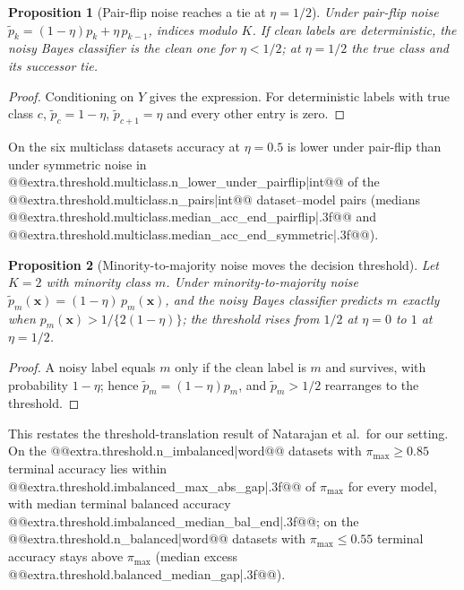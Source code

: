 \documentclass[pdflatex,sn-mathphys]{sn-jnl}
\theoremstyle{thmstyleone}
\newtheorem{appproposition}{Proposition}
\theoremstyle{thmstyletwo}
\theoremstyle{thmstylethree}
\begin{document}
\begin{appendices}
\begin{appproposition}[Pair-flip noise reaches a tie at $\eta=1/2$]\label{prop:a_pairflip_tie}
Under pair-flip noise $\tilde{p}_k=(1-\eta)p_k+\eta\,p_{k-1}$, indices modulo $K$. If clean labels are deterministic, the noisy Bayes classifier is the clean one for $\eta<1/2$; at $\eta=1/2$ the true class and its successor tie.
\end{appproposition}
\begin{proof}
Conditioning on $Y$ gives the expression. For deterministic labels with true class $c$, $\tilde{p}_c=1-\eta$, $\tilde{p}_{c+1}=\eta$ and every other entry is zero.
\end{proof}
On the six multiclass datasets accuracy at $\eta=0.5$ is lower under pair-flip than under symmetric noise in @@{extra.threshold.multiclass.n_lower_under_pairflip|int}@@ of the @@{extra.threshold.multiclass.n_pairs|int}@@ dataset--model pairs (medians @@{extra.threshold.multiclass.median_acc_end_pairflip|.3f}@@ and @@{extra.threshold.multiclass.median_acc_end_symmetric|.3f}@@).

\begin{appproposition}[Minority-to-majority noise moves the decision threshold]\label{prop:a_minority}
Let $K=2$ with minority class $m$. Under minority-to-majority noise $\tilde{p}_m(\mathbf{x})=(1-\eta)\,p_m(\mathbf{x})$, and the noisy Bayes classifier predicts $m$ exactly when $p_m(\mathbf{x})>1/\{2(1-\eta)\}$; the threshold rises from $1/2$ at $\eta=0$ to $1$ at $\eta=1/2$.
\end{appproposition}
\begin{proof}
A noisy label equals $m$ only if the clean label is $m$ and survives, with probability $1-\eta$; hence $\tilde{p}_m=(1-\eta)p_m$, and $\tilde{p}_m>1/2$ rearranges to the threshold.
\end{proof}
This restates the threshold-translation result of Natarajan et al.\ for our setting. On the @@{extra.threshold.n_imbalanced|word}@@ datasets with $\pi_{\max}\ge0.85$ terminal accuracy lies within @@{extra.threshold.imbalanced_max_abs_gap|.3f}@@ of $\pi_{\max}$ for every model, with median terminal balanced accuracy @@{extra.threshold.imbalanced_median_bal_end|.3f}@@; on the @@{extra.threshold.n_balanced|word}@@ datasets with $\pi_{\max}\le0.55$ terminal accuracy stays above $\pi_{\max}$ (median excess @@{extra.threshold.balanced_median_gap|.3f}@@).


\end{appendices}
\end{document}
